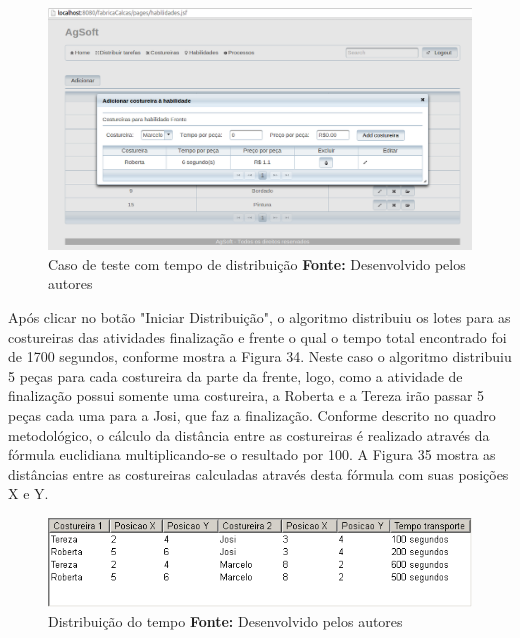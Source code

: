 \begin{figure}[h!]
	\centerline{\includegraphics[scale=0.3]{./imagens/costureira_frente_teste4.png}}
	\caption[Caso de teste com tempo de distribuição]
	{Caso de teste com tempo de distribuição \textbf{Fonte:} Desenvolvido pelos autores}
	\label{fig:add_costureira_frente_teste4}
\end{figure}




\par Após clicar no botão "Iniciar Distribuição", o algoritmo distribuiu os lotes para as costureiras das atividades
 finalização e frente o qual o tempo total encontrado foi de 1700 segundos,
 conforme mostra a Figura 34. Neste caso o algoritmo distribuiu 5 peças para cada costureira da parte da frente, logo, como a atividade de finalização possui somente uma costureira,
 a Roberta e a Tereza irão passar 5 peças cada uma para a Josi, que faz a
 finalização. Conforme descrito no quadro metodológico, o cálculo da distância entre as costureiras é realizado através da fórmula euclidiana multiplicando-se o resultado por 100.
 A Figura 35 mostra as distâncias entre as costureiras calculadas através desta
 fórmula com suas posições X e Y.
  
  \newpage
  
  \begin{figure}[h!]
  	\centerline{\includegraphics[scale=0.7]{./imagens/test_case_2_tempo_distribuicao.png}}
  	\caption[Distribuição do tempo]
  	{Distribuição do tempo  \textbf{Fonte:} Desenvolvido pelos autores}
  	\label{fig:exemplo1}
  \end{figure}
 
